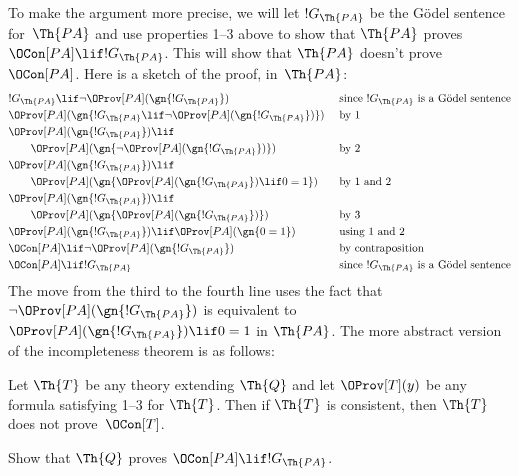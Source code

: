 \documentclass[../../include/open-logic-section]{subfiles}
\begin{document}
To make the argument more precise, we will let $!G_\Th{PA}$ be the
G\"odel sentence for~$\Th{PA}$ and use properties 1--3 above to show
that $\Th{PA}$ proves $\OCon[PA] \lif !G_\Th{PA}$. This will show that
$\Th{PA}$ doesn't prove $\OCon[PA]$. Here is a sketch of the proof,
in~$\Th{PA}$:
\begin{align*}
& !G_\Th{PA} \lif \lnot \OProv[PA](\gn{!G_\Th{PA}}) &\ & 
  \text{since $!G_\Th{PA}$ is a G\"odel  sentence} \\
& \OProv[PA](\gn{!G_\Th{PA} \lif \lnot \OProv[PA](\gn{!G_\Th{PA}})}) && 
   \text{by 1} \\
& \OProv[PA](\gn{!G_\Th{PA}}) \lif \\
& \qquad \OProv[PA](\gn{\lnot \OProv[PA](\gn{!G_\Th{PA}})}) &&
   \text{by 2} \\
& \OProv[PA](\gn{!G_\Th{PA}}) \lif \\
& \qquad \OProv[PA](\gn{\OProv[PA](\gn{!G_\Th{PA}}) \lif 0 = 1}) &&
   \text{by 1 and 2} \\
& \OProv[PA](\gn{!G_\Th{PA}}) \lif \\
& \qquad \OProv[PA](\gn{\OProv[PA](\gn{!G_\Th{PA}})}) &&
   \text{by 3} \\
& \OProv[PA](\gn{!G_\Th{PA}}) \lif \OProv[PA](\gn{0=1}) &&
   \text{using 1 and 2} \\
& \OCon[PA] \lif \lnot \OProv[PA](\gn{!G_\Th{PA}}) &&
   \text{by contraposition} \\
& \OCon[PA] \lif !G_\Th{PA} &&
   \text{since $!G_\Th{PA}$ is a G\"odel sentence}
\end{align*}
The move from the third to the fourth line uses the fact that $\lnot
\OProv[PA](\gn{!G_\Th{PA}})$ is equivalent to
$\OProv[PA](\gn{!G_\Th{PA}}) \lif 0 = 1$ in $\Th{PA}$. The more
abstract version of the incompleteness theorem is as follows:

\begin{thm}
  Let $\Th{T}$ be any theory extending $\Th{Q}$ and let
  $\OProv[T](y)$ be any formula satisfying 1--3 for $\Th{T}$. Then
  if $\Th{T}$ is consistent, then $\Th{T}$ does not prove~$\OCon[T]$.
\end{thm}

\begin{prob}
Show that $\Th{Q}$ proves $\OCon[PA] \lif !G_{\Th{PA}}$.
\end{prob}
\end{document}
